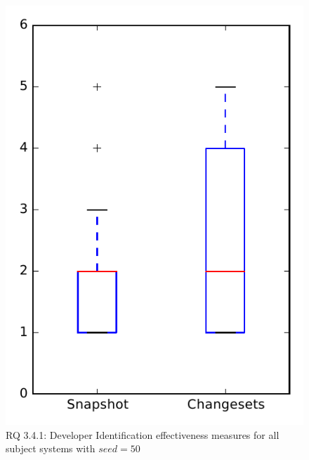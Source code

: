 
\begin{figure}
\centering
\includegraphics[height=0.4\textheight]{figures/dit_seed/rq1_overview_50}
\caption{RQ 3.4.1: Developer Identification effectiveness measures for all subject systems with $seed=50$}
\label{fig:dit_seed:rq1:overview}
\end{figure}
